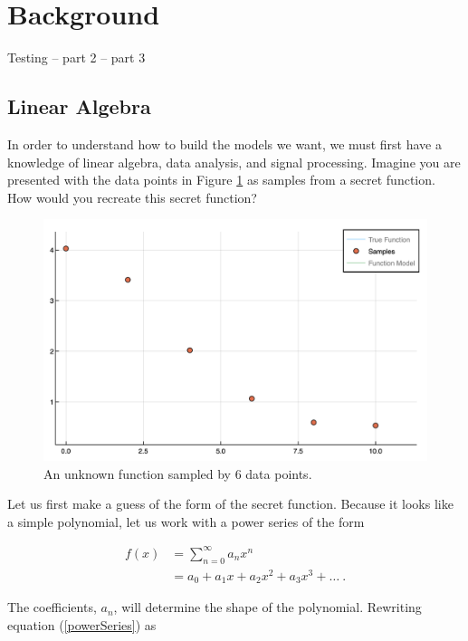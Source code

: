 \section{Background}\label{Sect:background}
Testing -- part 2 -- part 3
\subsection{Linear Algebra}\label{Sect:linearAlgebra}
In order to understand how to build the models we want, we must first have a knowledge of linear algebra, data analysis, and signal processing. Imagine you are presented with the data points in Figure \ref{figFunc1Samples} as samples from a secret function. How would you recreate this secret function?

\begin{figure}[h]
\includegraphics[scale = 0.4]{Figures/func1Samples}
\caption{An unknown function sampled by 6 data points.
\label{figFunc1Samples}} 
\end{figure}

\par Let us first make a guess of the form of the secret function. Because it looks like a simple polynomial, let us work with a power series of the form

\begin{align}
f(x) &= \sum_{n=0}^\infty a_n x^n
	\label{powerSum}\\ 
&= a_0 + a_1x + a_2x^2 + a_3x^3 +\ldots \ .
	\label{powerSeries}
\end{align}

\par The coefficients, $a_n$, will determine the shape of the polynomial. Rewriting equation (\ref{powerSeries}) as

